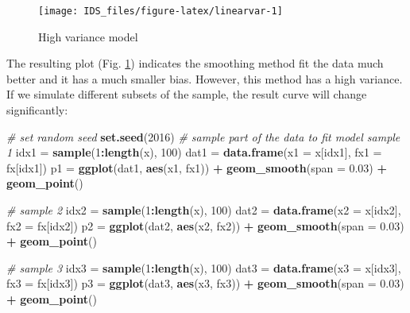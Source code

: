 \documentclass[12pt,]{krantz}
\makeatletter
\newenvironment{Shaded}{\begin{snugshade}}{\end{snugshade}}
\newcommand{\CommentTok}[1]{\textcolor[rgb]{0.37,0.37,0.37}{\textit{#1}}}
\newcommand{\DataTypeTok}[1]{\textcolor[rgb]{0.27,0.27,0.27}{#1}}
\newcommand{\DecValTok}[1]{\textcolor[rgb]{0.06,0.06,0.06}{#1}}
\newcommand{\FloatTok}[1]{\textcolor[rgb]{0.06,0.06,0.06}{#1}}
\newcommand{\KeywordTok}[1]{\textcolor[rgb]{0.27,0.27,0.27}{\textbf{#1}}}
\newcommand{\NormalTok}[1]{#1}
\newcommand{\OperatorTok}[1]{\textcolor[rgb]{0.43,0.43,0.43}{\textbf{#1}}}
\newcommand{\StringTok}[1]{\textcolor[rgb]{0.5,0.5,0.5}{#1}}
\newenvironment{kframe}{%
\medskip{}
\setlength{\fboxsep}{.8em}
 \def\at@end@of@kframe{}%
 \ifinner\ifhmode%
  \def\at@end@of@kframe{\end{minipage}}%
  \begin{minipage}{\columnwidth}%
 \fi\fi%
 \def\FrameCommand##1{\hskip\@totalleftmargin \hskip-\fboxsep
 \colorbox{shadecolor}{##1}\hskip-\fboxsep
     \hskip-\linewidth \hskip-\@totalleftmargin \hskip\columnwidth}%
 \MakeFramed {\advance\hsize-\width
   \@totalleftmargin\z@ \linewidth\hsize
   \@setminipage}}%
 {\par\unskip\endMakeFramed%
 \at@end@of@kframe}
\renewenvironment{Shaded}{\begin{kframe}}{\end{kframe}}
\makeatother
\begin{document}
\begin{figure}

{\centering \texttt{[image: IDS\_files/figure-latex/linearvar-1]} 

}

\caption{High variance model}\label{fig:linearvar}
\end{figure}

The resulting plot (Fig. \ref{fig:linearvar}) indicates the smoothing method fit the data much better and it has a much smaller bias. However, this method has a high variance. If we simulate different subsets of the sample, the result curve will change significantly:

\begin{Shaded}
\begin{Highlighting}[]
\CommentTok{# set random seed}
\KeywordTok{set.seed}\NormalTok{(}\DecValTok{2016}\NormalTok{)}
\CommentTok{# sample part of the data to fit model sample 1}
\NormalTok{idx1 =}\StringTok{ }\KeywordTok{sample}\NormalTok{(}\DecValTok{1}\OperatorTok{:}\KeywordTok{length}\NormalTok{(x), }\DecValTok{100}\NormalTok{)}
\NormalTok{dat1 =}\StringTok{ }\KeywordTok{data.frame}\NormalTok{(}\DataTypeTok{x1 =}\NormalTok{ x[idx1], }\DataTypeTok{fx1 =}\NormalTok{ fx[idx1])}
\NormalTok{p1 =}\StringTok{ }\KeywordTok{ggplot}\NormalTok{(dat1, }\KeywordTok{aes}\NormalTok{(x1, fx1)) }\OperatorTok{+}\StringTok{ }
\StringTok{  }\KeywordTok{geom_smooth}\NormalTok{(}\DataTypeTok{span =} \FloatTok{0.03}\NormalTok{) }\OperatorTok{+}\StringTok{ }
\StringTok{  }\KeywordTok{geom_point}\NormalTok{()}

\CommentTok{# sample 2}
\NormalTok{idx2 =}\StringTok{ }\KeywordTok{sample}\NormalTok{(}\DecValTok{1}\OperatorTok{:}\KeywordTok{length}\NormalTok{(x), }\DecValTok{100}\NormalTok{)}
\NormalTok{dat2 =}\StringTok{ }\KeywordTok{data.frame}\NormalTok{(}\DataTypeTok{x2 =}\NormalTok{ x[idx2], }\DataTypeTok{fx2 =}\NormalTok{ fx[idx2])}
\NormalTok{p2 =}\StringTok{ }\KeywordTok{ggplot}\NormalTok{(dat2, }\KeywordTok{aes}\NormalTok{(x2, fx2)) }\OperatorTok{+}\StringTok{ }
\StringTok{  }\KeywordTok{geom_smooth}\NormalTok{(}\DataTypeTok{span =} \FloatTok{0.03}\NormalTok{) }\OperatorTok{+}\StringTok{ }
\StringTok{  }\KeywordTok{geom_point}\NormalTok{()}

\CommentTok{# sample 3}
\NormalTok{idx3 =}\StringTok{ }\KeywordTok{sample}\NormalTok{(}\DecValTok{1}\OperatorTok{:}\KeywordTok{length}\NormalTok{(x), }\DecValTok{100}\NormalTok{)}
\NormalTok{dat3 =}\StringTok{ }\KeywordTok{data.frame}\NormalTok{(}\DataTypeTok{x3 =}\NormalTok{ x[idx3], }\DataTypeTok{fx3 =}\NormalTok{ fx[idx3])}
\NormalTok{p3 =}\StringTok{ }\KeywordTok{ggplot}\NormalTok{(dat3, }\KeywordTok{aes}\NormalTok{(x3, fx3)) }\OperatorTok{+}\StringTok{ }
\StringTok{  }\KeywordTok{geom_smooth}\NormalTok{(}\DataTypeTok{span =} \FloatTok{0.03}\NormalTok{) }\OperatorTok{+}\StringTok{ }
\StringTok{  }\KeywordTok{geom_point}\NormalTok{()}


\end{Highlighting}
\end{Shaded}
\end{document}
